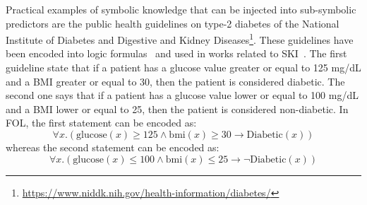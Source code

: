 Practical examples of symbolic knowledge that can be injected into sub-symbolic predictors are the public health guidelines on type-2 diabetes of the National Institute of Diabetes and Digestive and Kidney Diseases\footnote{\url{https://www.niddk.nih.gov/health-information/diabetes/}}.
%
These guidelines have been encoded into logic formulas~\cite{DBLP:conf/pkdd/KunapuliBSMS10} and used in works related to \gls{SKI}~\cite{Magnini-telmed2025}.
%
The first guideline state that if a patient has a glucose value greater or equal to 125 mg/dL and a \gls{BMI} greater or equal to 30, then the patient is considered diabetic.
%
The second one says that if a patient has a glucose value lower or equal to 100 mg/dL and a \gls{BMI} lower or equal to 25, then the patient is considered non-diabetic.
%
In \gls{FOL}, the first statement can be encoded as:
%
\begin{equation}\label{eq:rule-diabetic}
  \forall x . ( \text{glucose}(x) \geq 125 \land \text{bmi}(x) \geq 30 \rightarrow \text{Diabetic}(x))
\end{equation}
%
whereas the second statement can be encoded as:
%
\begin{equation}\label{eq:rule-not-diabetic}
  \forall x . ( \text{glucose}(x) \leq 100 \land \text{bmi}(x) \leq 25 \rightarrow \neg \text{Diabetic}(x))
\end{equation}


